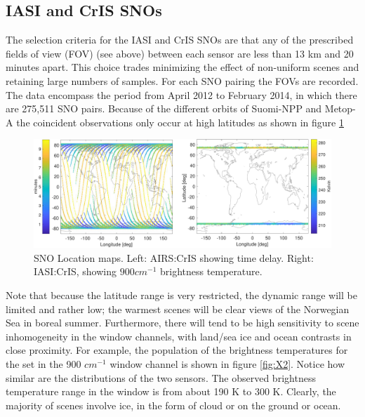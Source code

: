 \documentclass[twocolumn,10pt]{article}
\begin{document}
\subsection{IASI and CrIS SNOs}
The selection criteria for the IASI and CrIS SNOs are that any of the prescribed fields of view (FOV) (see above) between each sensor are less than 13 km and 20 minutes apart. This choice trades minimizing the effect of non-uniform scenes and retaining large numbers of samples.  For each SNO pairing the FOVs are recorded. The data encompass the period from April 2012 to February 2014, in which there are 275,511 SNO pairs. Because of the different orbits
of Suomi-NPP and Metop-A the coincident observations only occur at high latitudes as
shown in figure \ref{fig:X1}

\begin{figure}[htb]
\centering
\includegraphics[width=\linewidth]{./figs/ac_ic_jpl_sno_maps.pdf}
\caption{
  SNO Location maps. Left: AIRS:CrIS showing time delay. Right: IASI:CrIS, showing $900 cm^{-1}$ brightness temperature.}
\label{fig:X1}
\end{figure}

Note that because the latitude range is very restricted, the dynamic range will be limited and rather low; the warmest scenes will be clear views of the Norwegian Sea in boreal summer.  Furthermore, there will tend to be high sensitivity to scene inhomogeneity in the window channels, with land/sea ice and ocean contrasts in close proximity. For example, the population of
the brightness temperatures for the set in the 900 $cm^{-1}$ window channel is shown in figure \ref{fig:X2}. Notice how similar are the distributions of the two sensors.
The observed brightness temperature range in the window is from about 190 K to 300 K. Clearly,
the majority of scenes involve ice, in the form of cloud or on the ground or ocean.
\end{document}
